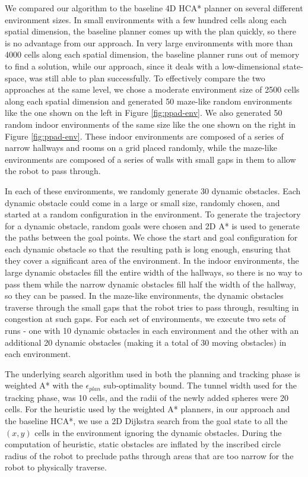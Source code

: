 We compared our algorithm to the baseline 4D HCA* planner on several different environment sizes. In small environments with a few hundred cells along each spatial dimension, the baseline planner comes up with the plan quickly, so there is no advantage from our approach. In very large environments with more than 4000 cells along each spatial dimension, the baseline planner runs out of memory to find a solution, while our approach, since it deals with a low-dimensional state-space, was still able to plan successfully. To effectively compare the two approaches at the same level, we chose a moderate environment size of 2500 cells along each spatial dimension and generated 50 maze-like random environments like the one shown on the left in Figure \ref{fig:ppad-env}. We also generated 50 random indoor environments of the same size like the one shown on the right in Figure \ref{fig:ppad-env}. These indoor environments are composed of a series of narrow hallways and rooms on a grid placed randomly, while the maze-like environments are composed of a series of walls with small gaps in them to allow the robot to pass through.

In each of these environments, we randomly generate 30 dynamic obstacles. Each dynamic obstacle could come in a large or small size, randomly chosen, and started at a random configuration in the environment. To generate the trajectory for a dynamic obstacle, random goals were chosen and 2D A* is used to generate the paths between the goal points. We chose the start and goal configuration for each dynamic obstacle so that the resulting path is long enough, ensuring that they cover a significant area of the environment. In the indoor environments, the large dynamic obstacles fill the entire width of the hallways, so there is no way to pass them while the narrow dynamic obstacles fill half the width of the hallway, so they can be passed. In the maze-like environments, the dynamic obstacles traverse through the small gaps that the robot tries to pass through, resulting in congestion at such gaps. For each set of environments, we execute two sets of runs - one with 10 dynamic obstacles in each environment and the other with an additional 20 dynamic obstacles (making it a total of 30 moving obstacles) in each environment.

The underlying search algorithm used in both the planning and tracking phase is weighted A* with the $\epsilon_{plan}$ sub-optimality bound. The tunnel width used for the tracking phase, was 10 cells, and the radii of the newly added spheres were 20 cells. For the heuristic used by the weighted A* planners, in our approach and the baseline HCA*, we use a 2D Dijkstra search from the goal state to all the $(x,y)$ cells in the environment ignoring the dynamic obstacles. During the computation of heuristic, static obstacles are inflated by the inscribed circle radius of the robot to preclude paths through areas that are too narrow for the robot to physically traverse. 

